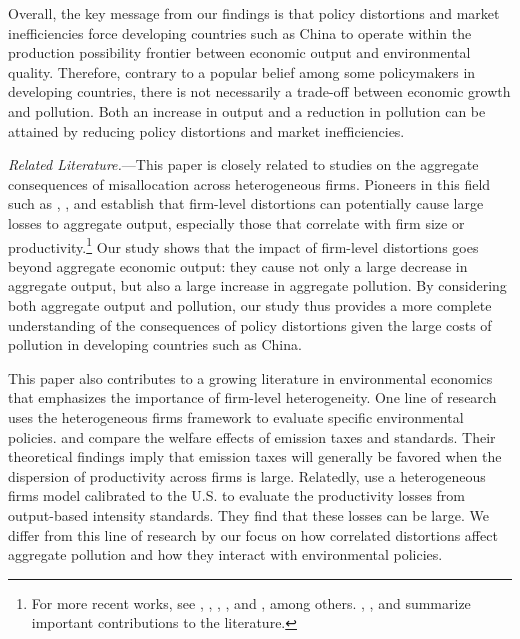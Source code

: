 \documentclass[AEJ]{AEA}
\begin{document}
Overall, the key message from our findings is that policy distortions and market inefficiencies force developing countries such as China to operate within the production possibility frontier between economic output and environmental quality. Therefore, contrary to a popular belief among some policymakers in developing countries, there is not necessarily a trade-off between economic growth and pollution. Both an increase in output and a reduction in pollution can be attained by reducing policy distortions and market inefficiencies.


\textit{Related Literature.}---This paper is closely related to studies on the aggregate consequences of misallocation across heterogeneous firms. Pioneers in this field such as \citet{Guneretal:2008}, \citet{RestucciaRogerson:2008}, and \citet{HsiehKlenow:2009} establish that firm-level distortions can potentially cause large losses to aggregate output, especially those that correlate with firm size or productivity.\footnote{For more recent works, see \citet{Bartelsmanetal:2013}, \citet{Bhattacharyaetal:2013}, \citet{HsiehKlenow:2014}, \citet{BentoRestuccia:2016}, and \citet{Guneretal:2017}, among others. \citet{RestucciaRogerson:2013}, \citet{Hopenhayn:2014b}, and \citet{RestucciaRogerson:2017} summarize important contributions to the literature.} Our study shows that the impact of firm-level distortions goes beyond aggregate economic output: they cause not only a large decrease in aggregate output, but also a large increase in aggregate pollution. By considering both aggregate output and pollution, our study thus provides a more complete understanding of the consequences of policy distortions given the large costs of pollution in developing countries such as China.

This paper also contributes to a growing literature in environmental economics that emphasizes the importance of firm-level heterogeneity. One line of research uses the heterogeneous firms framework to evaluate specific environmental policies. \citet{LiSun:2015} and \citet{LiShi:2017} compare the welfare effects of emission taxes and standards. Their theoretical findings imply that emission taxes will generally be favored when the dispersion of productivity across firms is large. Relatedly, \citet{TombeWinter:2015} use a heterogeneous firms model calibrated to the U.S. to evaluate the productivity losses from output-based intensity standards. They find that these losses can be large. We differ from this line of research by our focus on how correlated distortions affect aggregate pollution and how they interact with environmental policies.
\end{document}
